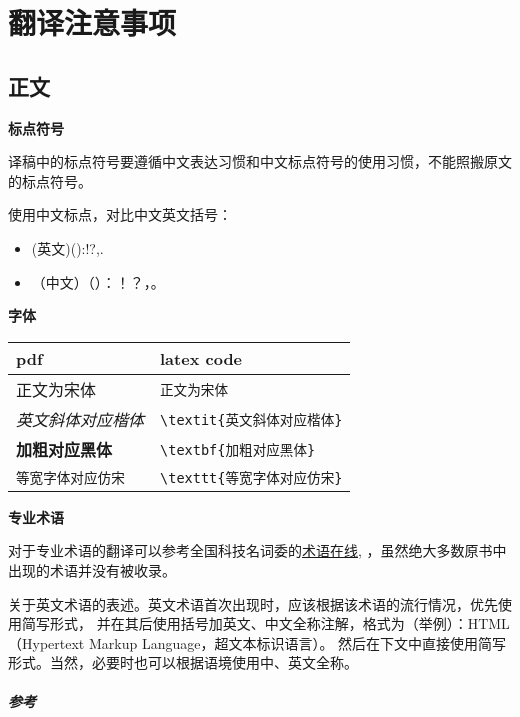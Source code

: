 \chapter{翻译注意事项}

\section{正文}

\textbf{标点符号}

译稿中的标点符号要遵循中文表达习惯和中文标点符号的使用习惯，不能照搬原文的标点符号。

使用中文标点，对比中文英文括号：
\begin{itemize}
    \item (英文)():!?,.
    \item （中文）（）：！？，。
\end{itemize}

\textbf{字体}

\vspace{4mm}
\begin{tabular}{ll}
    \toprule
    pdf                          &  latex code                         \\
    \midrule
    正文为宋体                   &  \verb!正文为宋体!                  \\
    \textit{英文斜体对应楷体}    &  \verb!\textit{英文斜体对应楷体}!   \\
    \textbf{加粗对应黑体}        &  \verb!\textbf{加粗对应黑体}!       \\
    \texttt{等宽字体对应仿宋}    &  \verb!\texttt{等宽字体对应仿宋}!   \\
    \bottomrule
\end{tabular}
\vspace{4mm}

\textbf{专业术语}

对于专业术语的翻译可以参考全国科技名词委的\href{http://www.termonline.cn/index.htm}{术语在线},
，虽然绝大多数原书中出现的术语并没有被收录。

关于英文术语的表述。英文术语首次出现时，应该根据该术语的流行情况，优先使用简写形式，
并在其后使用括号加英文、中文全称注解，格式为（举例）：HTML（Hypertext
Markup Language，超文本标识语言）。
然后在下文中直接使用简写形式。当然，必要时也可以根据语境使用中、英文全称。

\paragraph{参考}

